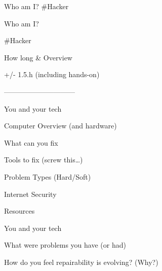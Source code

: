 

\begin{frame}[t,plain]
\titlepage
\end{frame}



\begin{frame}[t,fragile]{Who am I?}
\#Hacker
\end{frame}

\begin{frame}[t,fragile]{Who am I?}
\centerline {\#Hacker}
\end{frame}

How long & Overview

\item +/- 1.5.h (including hands-on)
\item ------------------------------
\item You and your tech
\item Computer Overview (and hardware)
\item What can you fix
\item Tools to fix (screw this\ldots)
\item Problem Types (Hard/Soft)
\item Internet Security
\item Resources


You and your tech

\item What were problems you have (or had)
\item How do you feel repairability is evolving? (Why?)


